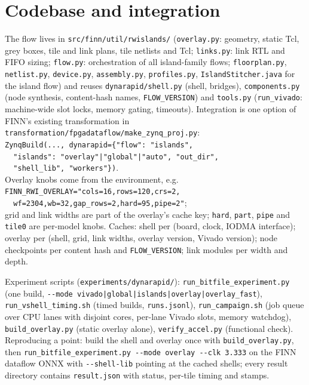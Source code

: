 \documentclass[10pt,twocolumn]{article}
\newcommand{\code}[1]{\texttt{\small #1}}
\begin{document}
\section{Codebase and integration}
The flow lives in \code{src/finn/util/rwislands/} (\code{overlay.py}: geometry, static Tcl, grey
boxes, tile and link plans, tile netlists and Tcl; \code{links.py}: link RTL and FIFO sizing;
\code{flow.py}: orchestration of all island-family flows; \code{floorplan.py}, \code{netlist.py},
\code{device.py}, \code{assembly.py}, \code{profiles.py}, \code{IslandStitcher.java} for the
island flow) and reuses \code{dynarapid/shell.py} (shell, bridges), \code{components.py} (node
synthesis, content-hash names, \code{FLOW\_VERSION}) and \code{tools.py} (\code{run\_vivado}:
machine-wide slot locks, memory gating, timeouts). Integration is one option of FINN's existing
transformation in \code{transformation/fpgadataflow/make\_zynq\_proj.py}:\\
\code{ZynqBuild(..., dynarapid=\{"flow": "islands",}\\
\code{\ \ "islands": "overlay"|"global"|"auto", "out\_dir",}\\
\code{\ \ "shell\_lib", "workers"\})}.\\
Overlay knobs come from the environment, e.g.\\
\code{FINN\_RWI\_OVERLAY="cols=16,rows=120,crs=2,}\\
\code{\ \ wf=2304,wb=32,gap\_rows=2,hard=95,pipe=2"};\\
grid and link widths are part of the overlay's cache key; \code{hard}, \code{part},
\code{pipe} and \code{tile0} are per-model knobs. Caches: shell per (board, clock, IODMA
interface); overlay per (shell, grid, link widths, overlay version, Vivado version); node
checkpoints per content hash and \code{FLOW\_VERSION}; link modules per width and depth.

Experiment scripts (\code{experiments/dynarapid/}): \code{run\_bitfile\_experiment.py} (one build,
\code{-{}-mode vivado|global|islands|overlay|overlay\_fast}), \code{run\_vshell\_timing.sh} (timed
builds, \code{runs.jsonl}), \code{run\_campaign.sh} (job queue over CPU lanes with disjoint
cores, per-lane Vivado slots, memory watchdog), \code{build\_overlay.py} (static overlay alone),
\code{verify\_accel.py} (functional check). Reproducing a point: build the shell and overlay once
with \code{build\_overlay.py}, then \code{run\_bitfile\_experiment.py -{}-mode overlay -{}-clk 3.333}
on the FINN dataflow ONNX with \code{-{}-shell-lib} pointing at the cached shells; every result
directory contains \code{result.json} with status, per-tile timing and stamps.
\end{document}
